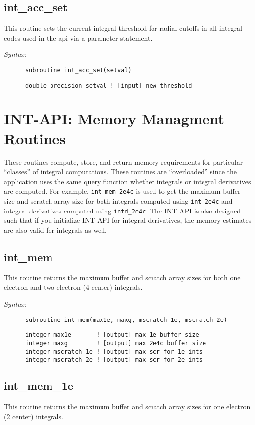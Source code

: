 \subsection{int\_acc\_set} 
This routine sets the current integral threshold  
for radial cutoffs in all integral codes used in the api via a  
parameter statement.   
 
{\it Syntax:} 
\begin{verbatim} 
      subroutine int_acc_set(setval) 
\end{verbatim} 
\begin{verbatim} 
      double precision setval ! [input] new threshold 
\end{verbatim} 
\section{INT-API: Memory Managment Routines} 
These routines compute, store, and return memory requirements for 
particular ``classes'' of integral computations.  These routines are 
``overloaded'' since the application uses the same query function 
whether integrals or integral derivatives are computed.  For example, 
\verb+int_mem_2e4c+ is used to get the maximum buffer size and scratch 
array size for both integrals computed using \verb+int_2e4c+ and 
integral derivatives computed using \verb+intd_2e4c+.  The INT-API is 
also designed such that if you initialize INT-API for integral 
derivatives, the memory estimates are also valid for integrals as 
well.   
% 
 
\subsection{int\_mem} 
This routine returns the maximum buffer and scratch array 
sizes for both one electron and two electron (4 center)  
integrals. 
 
{\it Syntax:} 
\begin{verbatim} 
      subroutine int_mem(max1e, maxg, mscratch_1e, mscratch_2e) 
\end{verbatim} 
\begin{verbatim} 
      integer max1e       ! [output] max 1e buffer size 
      integer maxg        ! [output] max 2e4c buffer size 
      integer mscratch_1e ! [output] max scr for 1e ints 
      integer mscratch_2e ! [output] max scr for 2e ints 
\end{verbatim} 
\subsection{int\_mem\_1e} 
This routine returns the maximum buffer and scratch array 
sizes for one electron (2 center) 
integrals. 
 
